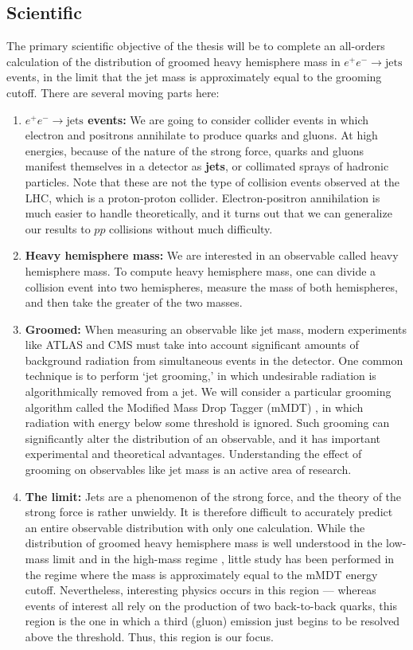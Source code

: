 \documentclass[../thesis.tex]{subfiles}
\begin{document}
\subsection{Scientific}
	The primary scientific objective of the thesis will be to complete an all-orders calculation of the distribution of groomed heavy hemisphere mass in $e^+ e^- \to \text{jets}$ events, in the limit that the jet mass is approximately equal to the grooming cutoff. There are several moving parts here:
	\begin{enumerate}
		\item \textbf{$e^+ e^- \to \text{jets}$ events:} We are going to consider collider events in which electron and positrons annihilate to produce quarks and gluons. At high energies, because of the nature of the strong force, quarks and gluons manifest themselves in a detector as \textbf{jets}, or collimated sprays of hadronic particles. Note that these are not the type of collision events observed at the LHC, which is a proton-proton collider. Electron-positron annihilation is much easier to handle theoretically, and it turns out that we can generalize our results to $pp$ collisions without much difficulty.

		\item \textbf{Heavy hemisphere mass:} We are interested in an observable called heavy hemisphere mass. To compute heavy hemisphere mass, one can divide a collision event into two hemispheres, measure the mass of both hemispheres, and then take the greater of the two masses.

		\item \textbf{Groomed:} When measuring an observable like jet mass, modern experiments like ATLAS and CMS must take into account significant amounts of background radiation from simultaneous events in the detector. One common technique is to perform `jet grooming,' in which undesirable radiation is algorithmically removed from a jet. We will consider a particular grooming algorithm called the Modified Mass Drop Tagger (mMDT) \cite{dasgupta_towards_2013}, in which radiation with energy below some threshold is ignored. Such grooming can significantly alter the distribution of an observable, and it has important experimental and theoretical advantages. Understanding the effect of grooming on observables like jet mass is an active area of research.

		\item \textbf{The limit:} Jets are a phenomenon of the strong force, and the theory of the strong force is rather unwieldy. It is therefore difficult to accurately predict an entire observable distribution with only one calculation. While the distribution of groomed heavy hemisphere mass is well understood in the low-mass limit \cite{kardos_groomed_2020,kardos_two-_2020,frye_factorization_2016} and in the high-mass regime \cite{kardos_soft-drop_2018}, little study has been performed in the regime where the mass is approximately equal to the mMDT energy cutoff. Nevertheless, interesting physics occurs in this region --- whereas events of interest all rely on the production of two back-to-back quarks, this region is the one in which a third (gluon) emission just begins to be resolved above the threshold. Thus, this region is our focus.


\end{enumerate}
\end{document}
